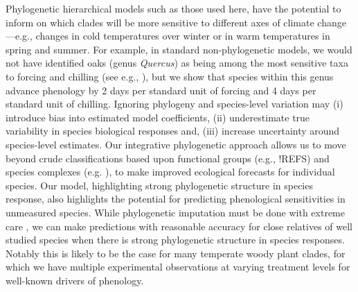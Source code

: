 \documentclass{article}\usepackage[]{graphicx}\usepackage[]{color}
\begin{document}
Phylogenetic hierarchical models such as those used here, have the potential to inform on which clades will be more sensitive to different axes of climate change---e.g., changes in cold temperatures over winter or in warm temperatures in spring and summer. For example, in standard non-phylogenetic models, we would not have identified oaks (genus \emph{Quercus}) as being among the most sensitive taxa to forcing and chilling (see e.g., \citep{ettinger2020}), but we show that species within this genus advance phenology by 2 days per standard unit of forcing and 4 days per standard unit of chilling. Ignoring phylogeny and species-level variation may (i) introduce bias into estimated model coefficients, (ii) underestimate true variability in species biological responses and, (iii) increase uncertainty around species-level estimates. Our integrative phylogenetic approach allows us to move beyond crude classifications based upon functional groups (e.g., !REFS) and species complexes (e.g. \cite{ettinger2020}), to make improved ecological forecasts for individual species. Our model, highlighting strong phylogenetic structure in species response, also highlights the potential for predicting phenological sensitivities in unmeasured species. While phylogenetic imputation must be done with extreme care \citep{molina2018assessing}, we can make predictions with reasonable accuracy for close relatives of well studied species when there is strong phylogenetic structure in species responses. Notably this is likely to be the case for many temperate woody plant clades, for which we have multiple experimental observations at varying treatment levels for well-known drivers of phenology.\\  
\end{document}
